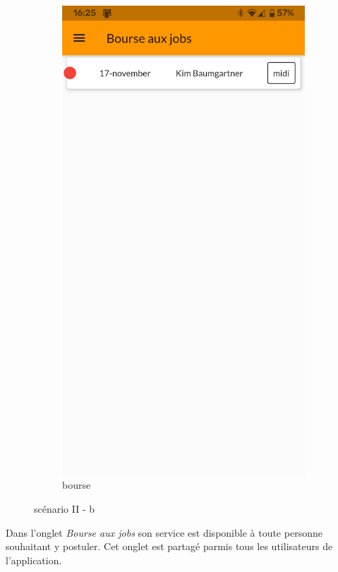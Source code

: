 \begin{figure}[!h]
\begin{subfigure}{.3\textwidth}
        \includegraphics[width=0.9\linewidth]{screenshots/scenario_02/bourse_jobs.png}
        \caption{bourse}
        \label{fig:bourse}
    \end{subfigure}
    \caption{scénario II - b}
    \label{fig:scen02b}
\end{figure}

Dans l'onglet \textit{Bourse aux jobs} son service est disponible à toute personne souhaitant y postuler. 
Cet onglet est partagé parmis tous les utilisateurs de l'application.


